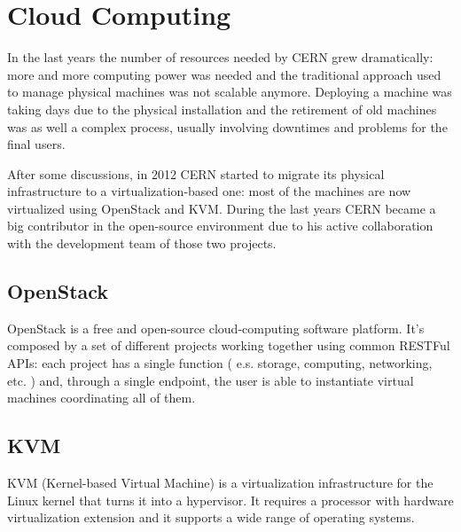 \section{Cloud Computing}

In the last years the number of resources needed by CERN grew
dramatically: more and more computing power was needed and the traditional
approach used to manage physical machines was not scalable anymore.
Deploying a machine was taking days due to the physical installation and
the retirement of old machines was as well a complex process, usually
involving downtimes and problems for the final users.

After some discussions, in 2012 CERN started to migrate its physical
infrastructure to a virtualization-based one: most of the machines are now
virtualized using OpenStack and KVM. During the last years CERN became
a big contributor in the open-source environment due to his active
collaboration with the development team of those two projects.

\subsection{OpenStack}

OpenStack is a free and open-source cloud-computing software platform.
It's composed by a set of different projects working together using common
RESTFul APIs: each project has a single function ( e.s. storage,
computing, networking, etc. ) and, through a single endpoint, the user is
able to instantiate virtual machines coordinating all of them.


\subsection{KVM}

KVM (Kernel-based Virtual Machine) is a virtualization infrastructure for
the Linux kernel that turns it into a hypervisor. It requires a processor
with hardware virtualization extension and it supports a wide range of
operating systems.

